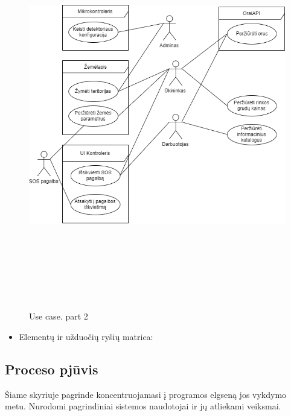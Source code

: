 \documentclass[oneside]{VUMIFPSkursinis}
\begin{document}
\begin{itemize}
\begin{figure}[H]
	\includegraphics[width=15cm,height=17cm,keepaspectratio]{UseCase2.png}
	\caption{Use case. part 2}
	\label{fig:UseCaseFull}
\end{figure}
\end{itemize}
\begin{itemize}
		\item Elementų ir užduočių ryšių matrica:
\end{itemize}
\pagebreak

\subsection{Proceso pjūvis}
Šiame skyriuje pagrinde koncentruojamasi į programos elgseną jos vykdymo metu. Nurodomi pagrindiniai sistemos naudotojai ir jų atliekami veiksmai.
\end{document}
